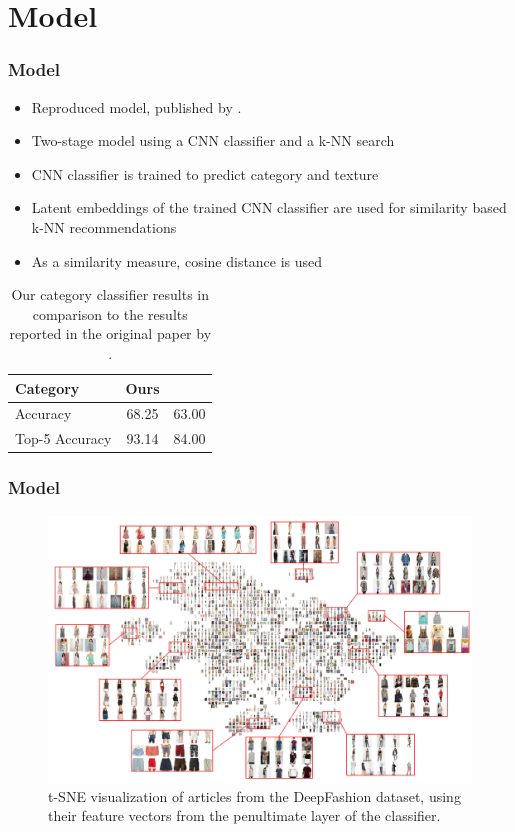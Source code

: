 \documentclass{beamer}
\begin{document}
	\section{Model}
	\begin{frame}
		\frametitle{Model}
		\begin{itemize}
			\item Reproduced model, published by \cite{tuinhof2018image}.
			\item Two-stage model using a CNN classifier and a k-NN search
			\item CNN classifier is trained to predict category and texture
			\item Latent embeddings of the trained CNN classifier are used for similarity based k-NN recommendations
			\item As a similarity measure, cosine distance is used
		\end{itemize}
		\begin{table}[H]
			\centering
			\label{tab:category-results}
			\begin{tabular}{ lcc } 
				\toprule		
				Category        & Ours & \cite{tuinhof2018image} \\
				\midrule
				Accuracy	    & 68.25 & 63.00\\
				Top-5 Accuracy  & 93.14 & 84.00 \\
				\bottomrule
			\end{tabular}
			\caption{Our category classifier results in comparison to the results reported in the original paper by \cite{tuinhof2018image}.}
		\end{table}
	\end{frame}
	
	\begin{frame}
		\frametitle{Model}
		\begin{figure}
			\centering
			\includegraphics[width=\textwidth]{../thesis/images/tsne/normal-24-epochs-magnified-rescaled}
			\caption{t-SNE visualization of articles from the DeepFashion dataset, using their feature vectors from the penultimate layer of the classifier.}
			\label{fig:tsne}
		\end{figure}
	\end{frame}
	
\end{document}
